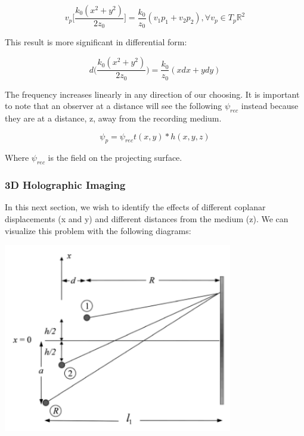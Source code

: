 \documentclass[12pt]{article}
\begin{document}
\begin{equation}
	v_{p}\bigg[ \frac{k_{0}(x^2 + y^2)}{2z_{0}} \bigg] = \frac{k_{0}}{z_{0}}(v_{1}p_{1} + v_{2}p_{2}), \forall v_{p} \in T_{p} \mathbb{R}^2
\end{equation}

This result is more significant in differential form:

\begin{equation}
	d \bigg( \frac{k_{0}(x^2 + y^2)}{2z_{0}} \bigg) = \frac{k_{0}}{z_{0}}(xdx + ydy)
\end{equation}

The frequency increases linearly in any direction of our choosing.
It is important to note that an observer at a distance will see the following 
\(\psi_{rec}\) instead because they are at a distance, z, away from the
recording medium.

\begin{equation}
	\psi_{p} = \psi_{rec}t(x,y)*h(x,y,z)
\end{equation}

Where \(\psi_{rec}\) is the field on the projecting surface.

\subsubsection{3D Holographic Imaging}

In this next section, we wish to identify the effects of different coplanar displacements 
(x and y) and different distances from the medium (z). We can visualize this problem with the following diagrams:

\begin{center}
\includegraphics[width=100mm]{tupac11.png}
\end{center}
\end{document}
